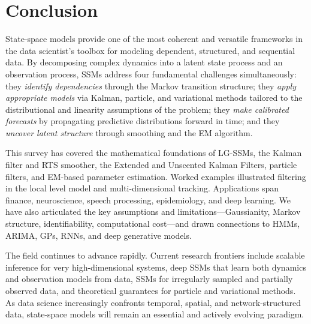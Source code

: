 \documentclass[conference]{IEEEtran}
\begin{document}
\section{Conclusion}
\label{sec:conclusion}

State-space models provide one of the most coherent and versatile frameworks in the data scientist's toolbox for modeling dependent, structured, and sequential data. By decomposing complex dynamics into a latent state process and an observation process, SSMs address four fundamental challenges simultaneously: they \emph{identify dependencies} through the Markov transition structure; they \emph{apply appropriate models} via Kalman, particle, and variational methods tailored to the distributional and linearity assumptions of the problem; they \emph{make calibrated forecasts} by propagating predictive distributions forward in time; and they \emph{uncover latent structure} through smoothing and the EM algorithm.

This survey has covered the mathematical foundations of LG-SSMs, the Kalman filter and RTS smoother, the Extended and Unscented Kalman Filters, particle filters, and EM-based parameter estimation. Worked examples illustrated filtering in the local level model and multi-dimensional tracking. Applications span finance, neuroscience, speech processing, epidemiology, and deep learning. We have also articulated the key assumptions and limitations---Gaussianity, Markov structure, identifiability, computational cost---and drawn connections to HMMs, ARIMA, GPs, RNNs, and deep generative models.

The field continues to advance rapidly. Current research frontiers include scalable inference for very high-dimensional systems, deep SSMs that learn both dynamics and observation models from data, SSMs for irregularly sampled and partially observed data, and theoretical guarantees for particle and variational methods. As data science increasingly confronts temporal, spatial, and network-structured data, state-space models will remain an essential and actively evolving paradigm.
\end{document}
